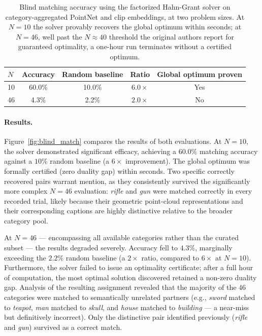 \begin{table}[H]
\centering
\small
\begin{tabular}{lcccc}
\toprule
\textbf{$N$} & \textbf{Accuracy} & \textbf{Random baseline} & \textbf{Ratio} & \textbf{Global optimum proven} \\
\midrule
10 & 60.0\% & 10.0\% & $6.0\times$ & Yes \\
46 & 4.3\%  &  2.2\% & $2.0\times$ & No \\
\bottomrule
\end{tabular}
\caption{Blind matching accuracy using the factorized Hahn-Grant solver
\cite{schnaus2025blind} on category-aggregated PointNet and \gls{clip}
embeddings, at two problem sizes. At $N=10$ the solver provably recovers
the global optimum within seconds; at $N=46$, well past the $N \approx 40$
threshold the original authors report for guaranteed optimality, a
one-hour run terminates without a certified optimum.}
\label{tab:blind_match_results}
\end{table}

\paragraph{Results.} Figure~\ref{fig:blind_match} compares the results of both evaluations. At $N=10$, the solver demonstrated significant efficacy, achieving a $60.0\%$ matching accuracy against a $10\%$ random baseline (a $6\times$ improvement). The global optimum was formally certified (zero duality gap) within seconds. Two specific correctly recovered pairs warrant mention, as they consistently survived the significantly more complex $N=46$ evaluation: \textit{rifle} and \textit{gun} were matched correctly in every recorded trial, likely because their geometric point-cloud representations and their corresponding captions are highly distinctive relative to the broader category pool.

At $N=46$ --- encompassing all available categories rather than the curated subset --- the results degraded severely. Accuracy fell to $4.3\%$, marginally exceeding the $2.2\%$ random baseline (a $2\times$ ratio, compared to $6\times$ at $N=10$). Furthermore, the solver failed to issue an optimality certificate; after a full hour of computation, the most optimal solution discovered retained a non-zero duality gap. Analysis of the resulting assignment revealed that the majority of the 46 categories were matched to semantically unrelated partners (e.g., \textit{sword} matched to \textit{teapot}, \textit{man} matched to \textit{skull}, and \textit{house} matched to \textit{building} --- a near-miss but definitively incorrect). Only the distinctive pair identified previously (\textit{rifle} and \textit{gun}) survived as a correct match.

